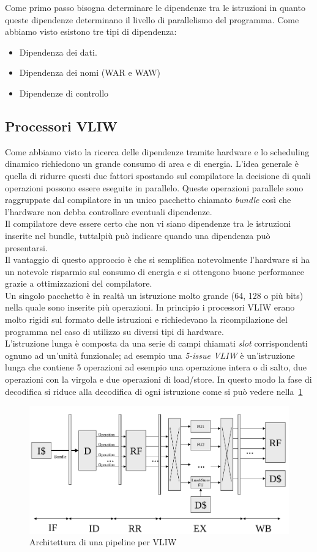 Come primo passo bisogna determinare le dipendenze tra le istruzioni in quanto queste dipendenze determinano il livello di parallelismo del programma. Come abbiamo visto esistono tre tipi di dipendenza:
\begin{itemize}
\item Dipendenza dei dati.
\item Dipendenza dei nomi (WAR e WAW)
\item Dipendenze di controllo
\end{itemize}
\subsection{Processori VLIW}
Come abbiamo visto la ricerca delle dipendenze tramite hardware e lo scheduling dinamico richiedono un grande consumo di area e di energia. L'idea generale è quella di ridurre questi due fattori spostando sul compilatore la decisione di quali operazioni possono essere eseguite in parallelo. Queste operazioni parallele sono raggruppate dal compilatore in un unico pacchetto chiamato \emph{bundle} così che l'hardware non debba controllare eventuali dipendenze.\\
Il compilatore deve essere certo che non vi siano dipendenze tra le istruzioni inserite nel bundle, tuttalpiù può indicare quando una dipendenza può presentarsi.\\
Il vantaggio di questo approccio è che si semplifica notevolmente l'hardware si ha un notevole risparmio sul consumo di energia e si ottengono buone performance grazie a ottimizzazioni del compilatore.\\
Un singolo pacchetto è in realtà un istruzione molto grande (64, 128 o più bits) nella quale sono inserite più operazioni. In principio i processori VLIW erano molto rigidi sul formato delle istruzioni e richiedevano la ricompilazione del programma nel caso di utilizzo su diversi tipi di hardware.\\
L'istruzione lunga è composta da una serie di campi chiamati \emph{slot} corrispondenti ognuno ad un'unità funzionale; ad esempio una \emph{5-issue VLIW} è un'istruzione lunga che contiene 5 operazioni ad esempio una operazione intera o di salto, due operazioni con la virgola e due operazioni di load/store. In questo modo la fase di decodifica si riduce alla decodifica di ogni istruzione come si può vedere nella \figurename\,\ref{fig:vliwarch}
\begin{figure}
\centering
\includegraphics[scale=0.4]{img/vliwarch.png}
\caption{Architettura di una pipeline per VLIW}\label{fig:vliwarch}
\end{figure}
